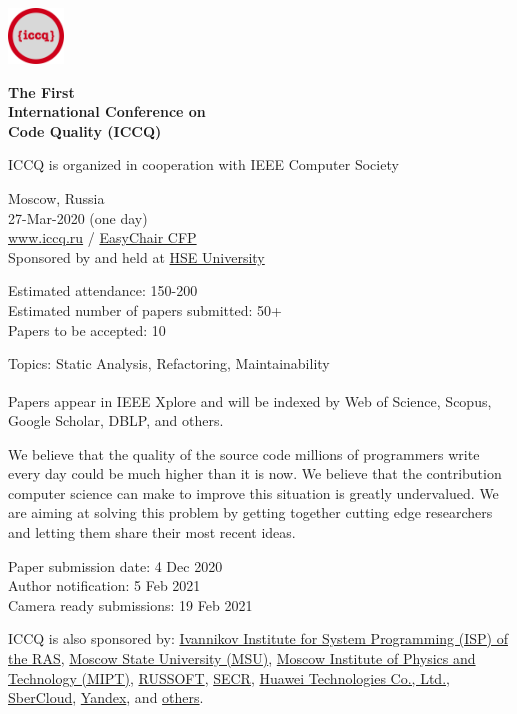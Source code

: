 \documentclass[12pt,oneside]{article}
\begin{document}
\selectfont
\raggedbottom
\raggedright
\setlength{\topskip}{6pt}
\setlength{\parindent}{0pt} %
\setlength{\parskip}{6pt} %

\includegraphics[height=4em]{../logo}

\textcolor{xred}{\bfseries
{\large The First} \\
{\Large International Conference on\\[3pt]
Code Quality (ICCQ)}}

ICCQ is organized in cooperation with IEEE Computer Society

\vspace{6pt}

Moscow, Russia \\
27-Mar-2020 (one day) \\
\href{https://www.iccq.ru}{www.iccq.ru} / \href{https://easychair.org/cfp/ICCQ20}{EasyChair CFP}\\

Sponsored by and held at \href{https://www.hse.ru/en/}{HSE University}

Estimated attendance: 150-200 \\
Estimated number of papers submitted: 50+ \\
Papers to be accepted: 10

\vspace{6pt}

Topics: Static Analysis, Refactoring, Maintainability

Papers appear in IEEE Xplore\textsuperscript{\textregistered}
and will be indexed by Web of Science, Scopus, Google Scholar, DBLP, and others.

We believe that the quality of the source code millions of programmers
write every day could be much higher than it is now. We believe that the
contribution computer science can make to improve this situation is greatly
undervalued. We are aiming at solving this problem by getting
together cutting edge researchers and letting them share their most recent ideas.

\vspace{6pt}

Paper submission date: 4 Dec 2020 \\
Author notification: 5 Feb 2021 \\
Camera ready submissions: 19 Feb 2021

\vspace{6pt}

ICCQ is also sponsored by:
\href{https://www.ispras.ru/en/}{Ivannikov Institute for System Programming (ISP) of the RAS},
\href{https://www.msu.ru/}{Moscow State University (MSU)},
\href{https://mipt.ru/english/}{Moscow Institute of Physics and Technology (MIPT)},
\href{https://russoft.org/en/}{RUSSOFT},
\href{https://2021.secrus.org/?lang=en}{SECR},
\href{https://www.huawei.com}{Huawei Technologies Co., Ltd.},
\href{https://sbercloud.ru/}{SberCloud},
\href{https://yandex.ru/}{Yandex},
and \href{https://www.iccq.ru/#partners}{others}.
\end{document}
